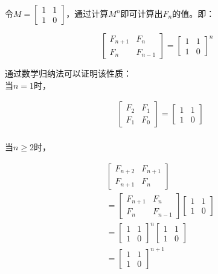 令$ M = \left[\begin{matrix} 1 & 1 \\ 1 & 0\end{matrix} \right] $，通过计算$ M^n $即可计算出$ F_n $的值。即：

$$
    \left[\begin{matrix} F_{n+1} & F_n \\ F_n & F_{n-1} \end{matrix} \right]
    = \left[\begin{matrix} 1 & 1 \\ 1 & 0 \end{matrix} \right]^n
$$

通过数学归纳法可以证明该性质： \\

当$ n = 1 $时，

\vspace{-1cm}

\begin{align*}
     & \left[\begin{matrix} F_2 & F_1 \\ F_1 & F_0 \end{matrix} \right]
    = \left[\begin{matrix} 1 & 1 \\ 1 & 0 \end{matrix} \right]  \\
\end{align*}

\vspace{-1cm}

当$ n \ge 2 $时，

\vspace{-1cm}

\begin{align*}
     & \left[\begin{matrix} F_{n+2} & F_{n+1} \\ F_{n+1} & F_n \end{matrix} \right]         \\
     & = \left[\begin{matrix} F_{n+1} & F_{n} \\ F_{n} & F_{n-1} \end{matrix} \right]
    \left[\begin{matrix} 1 & 1 \\ 1 & 0 \end{matrix} \right]            \\
     & = \left[\begin{matrix} 1 & 1 \\ 1 & 0 \end{matrix} \right]^n
    \left[\begin{matrix} 1 & 1 \\ 1 & 0 \end{matrix} \right]            \\
     & = \left[\begin{matrix} 1 & 1 \\ 1 & 0 \end{matrix} \right]^{n+1}
\end{align*}

